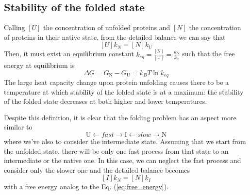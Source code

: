 \subsection{Stability of the folded state}
Calling $\left[U\right]$ the concentration of unfolded proteins and $\left[N\right]$ the concentration of proteins in their native state, from the detailed balance we can say that
\begin{equation*}
    \left[U\right]k_N = \left[N\right]k_U
\end{equation*}
Then, it must exist an equilibrium constant $k_{eq} = \frac{\left[\text{N}\right]}{\left[\text{U}\right]} = \frac{k_N}{k_U}$ such that the free energy at equilibrium is
\begin{equation}
    \Delta G = G_{\text{N}} - G_{\text{U}} = k_BT\ln k_{eq}
    \label{eq:free_energy}
\end{equation}
The large heat capacity change upon protein unfolding causes there to be a temperature at which stability of the folded state is at a maximum: the stability of the folded state decreases at both higher and lower temperatures.

Despite this definition, it is clear that the folding problem has an aspect more similar to
\begin{equation*}
    \text{U} \leftarrow fast \rightarrow \text{I} \leftarrow slow \rightarrow \text{N}
\end{equation*}
where we've also to consider the intermediate state.
Assuming that we start from the unfolded state, there will be only one fast process from that state to an intermediate or the native one.
In this case, we can neglect the fast process and consider only the slower one and the detailed balance becomes
\begin{equation*}
    \left[I\right]k_N = \left[N\right]k_I
\end{equation*}
with a free energy analog to the Eq. (\ref{eq:free_energy}).